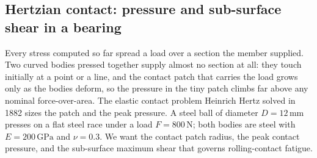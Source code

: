 

\subsection{Hertzian contact: pressure and sub-surface shear in a bearing}

Every stress computed so far spread a load over a section the member
supplied. Two curved bodies pressed together supply almost no section at
all: they touch initially at a point or a line, and the contact patch
that carries the load grows only as the bodies deform, so the pressure in
the tiny patch climbs far above any nominal force-over-area. The elastic
contact problem Heinrich Hertz solved in 1882 sizes the patch and the
peak pressure. A steel ball of diameter $D = 12\,\si{\milli\meter}$
presses on a flat steel race under a load $F = 800\,\text{N}$; both bodies
are steel with $E = 200\,\text{GPa}$ and $\nu = 0.3$. We want the contact
patch radius, the peak contact pressure, and the sub-surface maximum
shear that governs rolling-contact fatigue.

